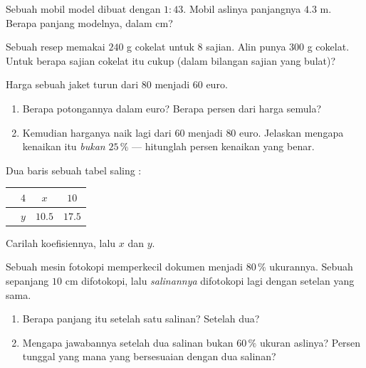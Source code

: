 \begin{exercise}[$\star$]\label{exo:g7:prop:7}
Sebuah mobil model dibuat dengan  $1 : 43$. Mobil aslinya
panjangnya $4.3$ m. Berapa panjang modelnya, dalam cm?
\end{exercise}

\begin{exercise}[$\star\star$]\label{exo:g7:prop:8}
Sebuah resep memakai $240$ g cokelat untuk $8$ sajian. Alin punya
$300$ g cokelat. Untuk berapa sajian cokelat itu cukup (dalam bilangan
sajian yang bulat)?
\end{exercise}

\begin{exercise}[$\star\star$]\label{exo:g7:prop:9}
Harga sebuah jaket turun dari $80$ menjadi $60$ euro.
\begin{enumerate}
  \item Berapa potongannya dalam euro? Berapa persen dari harga
        semula?
  \item Kemudian harganya naik lagi dari $60$ menjadi $80$ euro.
        Jelaskan mengapa kenaikan itu \emph{bukan} $25\,\%$ ---
        hitunglah persen kenaikan yang benar.
\end{enumerate}
\end{exercise}

\begin{exercise}[$\star\star$]\label{exo:g7:prop:10}
Dua baris sebuah tabel saling :
\begin{center}
\renewcommand{\arraystretch}{1.2}
\begin{tabular}{l|ccc}
 & $4$ & $x$ & $10$ \\
\hline
 & $y$ & $10.5$ & $17.5$ \\
\end{tabular}
\end{center}
Carilah koefisiennya, lalu $x$ dan $y$.
\end{exercise}

\begin{exercise}[$\star\star\star$]\label{exo:g7:prop:11}
Sebuah mesin fotokopi memperkecil dokumen menjadi $80\,\%$ ukurannya.
Sebuah  sepanjang $10$ cm difotokopi, lalu \emph{salinannya}
difotokopi lagi dengan setelan yang sama.
\begin{enumerate}
  \item Berapa panjang  itu setelah satu salinan? Setelah
        dua?
  \item Mengapa jawabannya setelah dua salinan bukan $60\,\%$ ukuran
        aslinya? Persen tunggal yang mana yang bersesuaian dengan dua
        salinan?
\end{enumerate}
\end{exercise}

